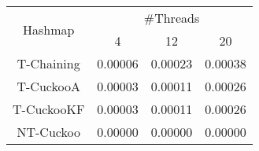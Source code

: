 \begin{tabular}{|c|c|c|c|}
\hline
\multirow{2}{*}{Hashmap} & \multicolumn{3}{c|}{\#Threads}\\\cline{2-4}& 4 & 12 & 20\\
\hline
\hline
T-Chaining & 0.00006 & 0.00023 & 0.00038\\
T-CuckooA & 0.00003 & 0.00011 & 0.00026\\
T-CuckooKF & 0.00003 & 0.00011 & 0.00026\\
NT-Cuckoo & 0.00000 & 0.00000 & 0.00000\\
\hline
\end{tabular}
